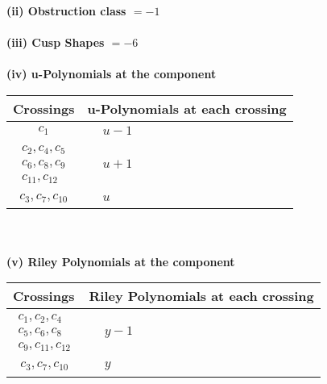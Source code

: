 \documentclass[1p]{elsarticle_modified}
\theoremstyle{definition}
\begin{document}
\flushleft \textbf{(ii) Obstruction class $= -1$}\\~\\
\flushleft \textbf{(iii) Cusp Shapes $= -6$}\\~\\
\newpage\renewcommand{\arraystretch}{1}
\flushleft \textbf{(iv) u-Polynomials at the component}\newline \\
\begin{tabular}{m{50pt}|m{274pt}}
Crossings & \hspace{64pt}u-Polynomials at each crossing \\
\hline $$\begin{aligned}c_{1}\end{aligned}$$&$\begin{aligned}
&u-1
\end{aligned}$\\
\hline $$\begin{aligned}c_{2},c_{4},c_{5}\\c_{6},c_{8},c_{9}\\c_{11},c_{12}\end{aligned}$$&$\begin{aligned}
&u+1
\end{aligned}$\\
\hline $$\begin{aligned}c_{3},c_{7},c_{10}\end{aligned}$$&$\begin{aligned}
&u
\end{aligned}$\\
\hline
\end{tabular}\\~\\
\newpage\renewcommand{\arraystretch}{1}
\flushleft \textbf{(v) Riley Polynomials at the component}\newline \\
\begin{tabular}{m{50pt}|m{274pt}}
Crossings & \hspace{64pt}Riley Polynomials at each crossing \\
\hline $$\begin{aligned}c_{1},c_{2},c_{4}\\c_{5},c_{6},c_{8}\\c_{9},c_{11},c_{12}\end{aligned}$$&$\begin{aligned}
&y-1
\end{aligned}$\\
\hline $$\begin{aligned}c_{3},c_{7},c_{10}\end{aligned}$$&$\begin{aligned}
&y
\end{aligned}$\\
\hline
\end{tabular}\\~\\
\end{document}
